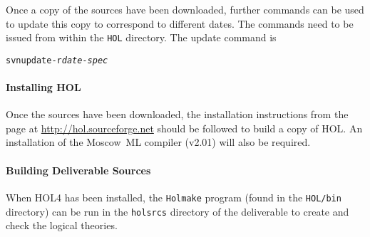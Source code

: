\documentclass[11pt]{article}
\begin{document}
Once a copy of the sources have been downloaded, further commands can
be used to update this copy to correspond to different dates.  The
commands need to be issued from within the \texttt{HOL} directory.
The update command is
\begin{alltt}
   svn update -r \textit{date-spec}
\end{alltt}

\paragraph{Installing HOL} Once the sources have been downloaded, the
installation instructions from the page at
\url{http://hol.sourceforge.net} should be followed to build a copy of
HOL.  An installation of the Moscow~ML compiler (v2.01) will also be
required.

\paragraph{Building Deliverable Sources}
When HOL4 has been installed, the \texttt{Holmake} program (found in
the \texttt{HOL/bin} directory) can be run in the \texttt{holsrcs}
directory of the \cpp{} deliverable to create and check the logical
theories.

\nocite{Stroustrup1994:DECPP,Stroustrup2000:TCPL,Paulson:ML,Gordon93}
\nocite{Rushby93}
\newpage



\printindex
\end{document}
